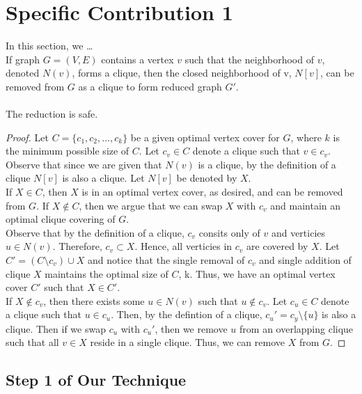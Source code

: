 \documentclass[../techreport.tex]{subfiles}
\begin{document}
\section{Specific Contribution 1}
\label{sec:specific1}
In this section, we \ldots \\
 If graph $G = (V, E)$ contains a vertex $v$ such that the neighborhood of $v$, denoted $N(v)$, forms a clique, then the closed neighborhood of v, $N[v]$, can be removed from $G$ as a clique to form reduced graph $G'$. \\ \\
 The reduction is safe.
\begin{proof}
	Let $C = \{c_1, c_2, \dots, c_k\}$ be a given optimal vertex cover for $G$, where $k$ is the minimum possible size of $C$. Let $c_v \in C$ denote a clique such that $v \in c_v$. Observe that since we are given that $N(v)$ is a clique, by the definition of a clique $N[v]$ is also a clique. Let $N[v]$ be denoted by $X$. \\
	If $X \in C$, then $X$ is in an optimal vertex cover, as desired, and can be removed from $G$. If $X \notin C$, then we argue that we can swap $X$ with $c_v$ and maintain an optimal clique covering of $G$. \\
	Observe that by the definition of a clique, $c_v$ consits only of $v$ and verticies $u \in N(v)$. Therefore, $c_v \subset X$. Hence, all verticies in $c_v$ are covered by $X$. Let $C' = (C \setminus c_v) \cup X$ and notice that the single removal of $c_v$ and single addition of clique $X$ maintains the optimal size of $C$, k. Thus, we have an optimal vertex cover $C'$ such that $X \in C'$. \\
	If $X \notin c_v$, then there exists some $u \in N(v)$ such that $u \notin c_v$. Let $c_u \in C$ denote a clique such that $u \in c_u$. Then, by the defintion of a clique, $c_u' = c_y \setminus \{u\}$ is also a clique. Then if we swap $c_u$ with $c_u'$, then we remove $u$ from an overlapping clique such that all $v \in X$ reside in a single clique. Thus, we can remove $X$ from $G$.
\end{proof}
\subsection{Step 1 of Our Technique}
\lipsum[16]
\end{document}
